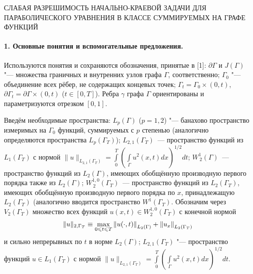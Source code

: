 \vzmstitle
{
	СЛАБАЯ РАЗРЕШИМОСТЬ НАЧАЛЬНО-КРАЕВОЙ ЗАДАЧИ ДЛЯ ПАРАБОЛИЧЕСКОГО УРАВНЕНИЯ В КЛАССЕ СУММИРУЕМЫХ НА ГРАФЕ ФУНКЦИЙ
}

\vzmscaption

\paragraph{1. Основные понятия и вспомогательные предложения.}
Используются понятия и сохраняются обозначения, принятые в [1]:
$\partial\Gamma$ и $J(\Gamma)$ "--- множества граничных и внутренних узлов графа $\Gamma$, соответственно; $\Gamma_{0}$ "--- объединение всех рёбер, не содержащих концевых точек;  $\Gamma_{t}=\Gamma_{0}\times(0,t)$, $\partial \Gamma_{t}=\partial \Gamma\times(0,t)$ ($t\in[0,T]$). Ребра $\gamma$ графа $\Gamma$ ориентированы и параметризуются отрезком $[0,1]$.

Введём необходимые пространства: $L_{p}(\Gamma)$ ($p=1,2$) "--- банахово пространство измеримых на $\Gamma_0$ функций, суммируемых с $p$ степенью (аналогично определяются пространства $L_{p}(\Gamma_T)$); $L_{2,1}(\Gamma_{T})$~--- пространство функций из $L_1(\Gamma_{T})$ с нормой  $\|u\|_{L_{2,1}(\Gamma_{T})}=\int\limits_0^T(\int\limits_{\Gamma}u^2(x,t)dx)^{1/2}dt$; $W_{\,2}^{1}(\Gamma)$~--- пространство функций из $L_{2}(\Gamma)$, имеющих обобщённую производную первого порядка также из $L_{2}(\Gamma)$; $W_{\,2}^{1,0}(\Gamma_{T})$~--- пространство функций из $L_{2}(\Gamma_{T})$, имеющих обобщённую производную первого порядка по $x$, принадлежащую $L_{2}(\Gamma_{T})$ (аналогично вводится пространство $W^{1}(\Gamma_{T})$.
Обозначим через $V_{2}(\Gamma_{T})$ множество всех функций  $u(x,t)\in W_{2}^{1,0}(\Gamma_{T})$ с конечной нормой
\begin{equation}\label{eq1}
{{\begin{array}{*{20}c}
\|u\|_{2,\Gamma_{T}}\equiv \mathop{\max}\limits_{0\leqslant t\leqslant T}\left\|u(\cdot,t)\right\|_{L_2(\Gamma)}+\left\|u_x\right\|_{L_2(\Gamma_{T})}
\end{array} }}
\end{equation}
и сильно непрерывных по $t$ в норме $L_{2}(\Gamma)$; $L_{2,1}(\Gamma_{T})$ "--- пространство функций $u\in L_1(\Gamma_{T})$ с нормой  $\|u\|_{L_{2,1}(\Gamma_{T})}=\int\limits_0^T(\int\limits_{\Gamma}u^2(x,t)dx)^{1/2}dt$.


